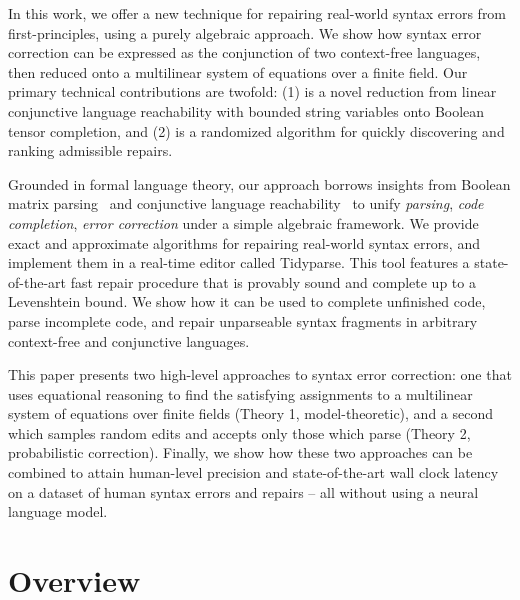 \documentclass[sigplan,review,anonymous,acmsmall]{acmart}\settopmatter{printfolios=false,printccs=false,printacmref=false}
\begin{document}
In this work, we offer a new technique for repairing real-world syntax errors from first-principles, using a purely algebraic approach. We show how syntax error correction can be expressed as the conjunction of two context-free languages, then reduced onto a multilinear system of equations over a finite field. Our primary technical contributions are twofold: (1) is a novel reduction from linear conjunctive language reachability with bounded string variables onto Boolean tensor completion, and (2) is a randomized algorithm for quickly discovering and ranking admissible repairs.

Grounded in formal language theory, our approach borrows insights from Boolean matrix parsing~\cite{valiant1975general} and conjunctive language reachability~\cite{zhang2017context} to unify \textit{parsing}, \textit{code completion}, \textit{error correction} under a simple algebraic framework. We provide exact and approximate algorithms for repairing real-world syntax errors, and implement them in a real-time editor called Tidyparse. This tool features a state-of-the-art fast repair procedure that is provably sound and complete up to a Levenshtein bound. We show how it can be used to complete unfinished code, parse incomplete code, and repair unparseable syntax fragments in arbitrary context-free and conjunctive languages.

This paper presents two high-level approaches to syntax error correction: one that uses equational reasoning to find the satisfying assignments to a multilinear system of equations over finite fields (Theory 1, model-theoretic), and a second which samples random edits and accepts only those which parse (Theory 2, probabilistic correction). Finally, we show how these two approaches can be combined to attain human-level precision and state-of-the-art wall clock latency on a dataset of human syntax errors and repairs -- all without using a neural language model.

\section{Overview}
\end{document}
